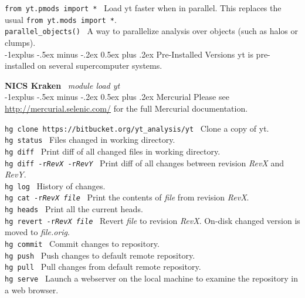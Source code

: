 \documentclass[10pt,landscape]{article}
\makeatletter
\renewcommand{\subsection}{\@startsection{subsection}{2}{0mm}%
                                {-1explus -.5ex minus -.2ex}%
                                {0.5ex plus .2ex}%
                                {\normalfont\normalsize\bfseries}}
\makeatother
\begin{document}
\begin{multicols}{3}
\texttt{from yt.pmods import *} \textemdash\ Load yt faster when in parallel.
This replaces the usual \texttt{from yt.mods import *}.\\
\texttt{parallel\_objects()} \textemdash\ A way to parallelize analysis over objects
(such as halos or clumps).\\


\subsection{Pre-Installed Versions}
yt is pre-installed on several supercomputer systems.

\textbf{NICS Kraken} \textemdash\ {\it module load yt} \\


\subsection{Mercurial}
Please see \url{http://mercurial.selenic.com/} for the full Mercurial documentation.

\texttt{hg clone https://bitbucket.org/yt\_analysis/yt} \textemdash\ Clone a copy of yt. \\
\texttt{hg status} \textemdash\ Files changed in working directory.\\
\texttt{hg diff} \textemdash\ Print diff of all changed files in working directory. \\
\texttt{hg diff -r{\it RevX} -r{\it RevY}} \textemdash\ Print diff of all changes between revision {\it RevX} and {\it RevY}.\\
\texttt{hg log} \textemdash\ History of changes.\\
\texttt{hg cat -r{\it RevX file}} \textemdash\ Print the contents of {\it file} from revision {\it RevX}.\\
\texttt{hg heads} \textemdash\ Print all the current heads. \\
\texttt{hg revert -r{\it RevX file}} \textemdash\ Revert {\it file} to revision {\it RevX}. On-disk changed version is
moved to {\it file.orig}. \\
\texttt{hg commit} \textemdash\ Commit changes to repository. \\
\texttt{hg push} \textemdash\ Push changes to default remote repository. \\
\texttt{hg pull} \textemdash\ Pull changes from default remote repository. \\
\texttt{hg serve} \textemdash\ Launch a webserver on the local machine to examine the repository in a web browser. \\


\end{multicols}
\end{document}
